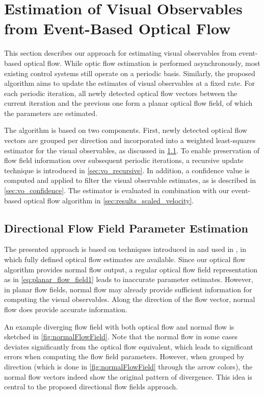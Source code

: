 \section{Estimation of Visual Observables from Event-Based Optical Flow}
\label{sec:landing_eof}
This section describes our approach for estimating visual observables from event-based optical flow. While optic flow estimation is performed asynchronously, most existing control systems still operate on a periodic basis. Similarly, the proposed algorithm aims to update the estimates of visual observables at a fixed rate. For each periodic iteration, all newly detected optical flow vectors between the current iteration and the previous one form a planar optical flow field, of which the parameters are estimated. 

The algorithm is based on two components. First, newly detected optical flow vectors are grouped per direction and incorporated into a weighted least-squares estimator for the visual observables, as discussed in \cref{sec:vo_directional_flow_fields}. To enable preservation of flow field information over subsequent periodic iterations, a recursive update technique is introduced in \cref{sec:vo_recursive}. In addition, a confidence value is computed and applied to filter the visual observable estimates, as is described in \cref{sec:vo_confidence}. The estimator is evaluated in combination with our event-based optical flow algorithm in \cref{sec:results_scaled_velocity}.

\subsection{Directional Flow Field Parameter Estimation}
\label{sec:vo_directional_flow_fields}
The presented approach is based on techniques introduced in \citet{DeCroon2013} and used in \citet{Alkowatly2015,Ho2016}, in which fully defined optical flow estimates are available. Since our optical flow algorithm provides normal flow output, a regular optical flow field representation as in \cref{eq:planar_flow_field1} leads to inaccurate parameter estimates. However, in planar flow fields, normal flow may already provide sufficient information for computing the visual observables. Along the direction of the flow vector, normal flow does provide accurate information. 

An example diverging flow field with both optical flow and normal flow is sketched in \cref{fig:normalFlowField}. Note that the normal flow in some cases deviates significantly from the optical flow equivalent, which leads to significant errors when computing the flow field parameters. However, when grouped by direction (which is done in \cref{fig:normalFlowField} through the arrow colors), the normal flow vectors indeed show the original pattern of divergence. This idea is central to the proposed directional flow fields approach.

